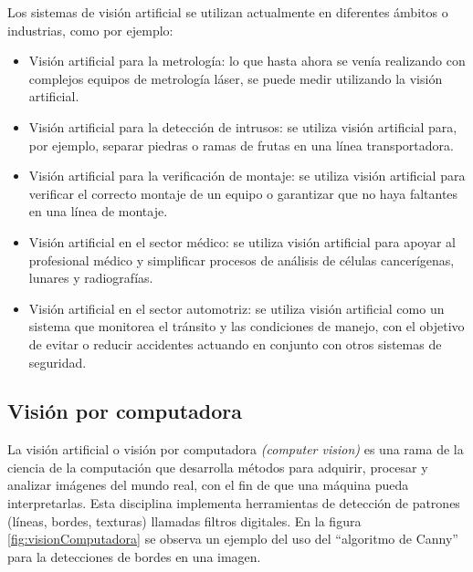 
\newpage

Los sistemas de visión artificial se utilizan actualmente en diferentes ámbitos o industrias, como por ejemplo:
\begin{itemize}
\item Visión artificial para la metrología: lo que hasta ahora se venía realizando con complejos equipos de metrología láser, se puede medir utilizando la visión artificial.
\item Visión artificial para la detección de intrusos: se utiliza visión artificial para, por ejemplo, separar piedras o ramas de frutas en una línea transportadora.
\item Visión artificial para la verificación de montaje: se utiliza visión artificial para verificar el correcto montaje de un equipo o garantizar que no haya faltantes en una línea de montaje.
\item Visión artificial en el sector médico: se utiliza visión artificial para apoyar al profesional médico y simplificar procesos de análisis de células cancerígenas, lunares y radiografías.
\item Visión artificial en el sector automotriz: se utiliza visión artificial como un sistema que monitorea el tránsito y las condiciones de manejo, con el objetivo de evitar o reducir accidentes actuando en conjunto con otros sistemas de seguridad.
\end{itemize}

\subsection{Visión por computadora}

La visión artificial o visión por computadora \textit{(computer vision)} \citep{COMPUTER_VISION} es una rama de la ciencia de la computación que desarrolla métodos para adquirir, procesar y analizar imágenes del mundo real, con el fin de que una máquina pueda interpretarlas. Esta disciplina implementa herramientas de detección de patrones (líneas, bordes, texturas) llamadas filtros digitales. En la figura \ref{fig:visionComputadora} se observa un ejemplo del uso del ``algoritmo de Canny'' para la detecciones de bordes en una imagen.

